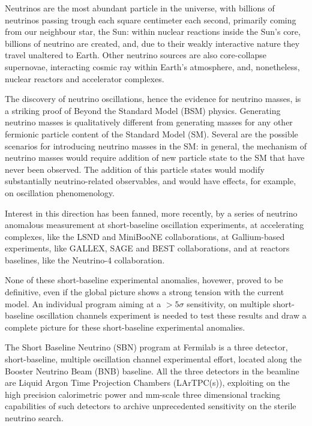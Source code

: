 

Neutrinos are the most abundant particle in the universe, with billions of neutrinos passing trough each square centimeter each second, primarily coming from our neighbour star, the Sun: within nuclear reactions inside the Sun's core, billions of neutrino are created, and, due to their weakly interactive nature they travel unaltered to Earth. Other neutrino sources are also core-collapse supernovae, interacting cosmic ray within Earth's atmosphere, and, nonetheless, nuclear reactors and accelerator complexes. 

The discovery of neutrino oscillations, hence the evidence for neutrino masses, is a striking proof of Beyond the Standard Model (BSM) physics. 
Generating neutrino masses is qualitatively different from generating masses for any other fermionic particle content of the Standard Model (SM).  
Several are the possible scenarios for introducing neutrino masses in the SM: in general, the mechanism of neutrino masses would require addition of new particle state to the SM that have never been observed. The addition of this particle states would modify substantially neutrino-related observables, and would have effects, for example, on oscillation phenomenology. 

Interest in this direction has been fanned, more recently, by a series of neutrino anomalous measurement at short-baseline oscillation experiments, at accelerating complexes, like the LSND and MiniBooNE collaborations, at Gallium-based experiments, like GALLEX, SAGE and BEST collaborations, and at reactors baselines, like the Neutrino-4 collaboration.

None of these short-baseline experimental anomalies, hovewer, proved to be definitive, even if the global picture shows a strong tension with the current model. An individual program aiming at a $>5\sigma$ sensitivity, on multiple short-baseline oscillation channels experiment is needed to test these results and draw a complete picture for these short-baseline experimental anomalies. 

The Short Baseline Neutrino (SBN) program at Fermilab is a three detector, short-baseline, multiple oscillation channel experimental effort, located along the Booster Neutrino Beam (BNB) baseline. All the three detectors in the beamline are Liquid Argon Time Projection Chambers (LArTPC(s)), exploiting on the high precision calorimetric power and mm-scale three dimensional tracking capabilities of such detectors to archive unprecedented sensitivity on the sterile neutrino search. 

